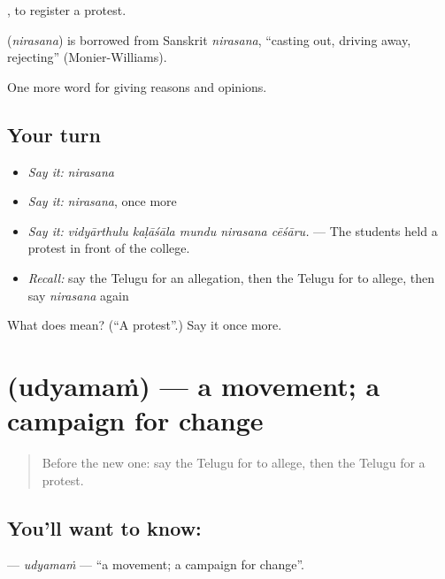  , to register a protest.

\begin{cousinweb}
\textbf{} (\emph{nirasana}) is borrowed from Sanskrit \emph{nirasana}, \textquotedblleft{}casting out, driving away, rejecting\textquotedblright{} (Monier-Williams).
\end{cousinweb}

\begin{grammarlens}[title={What you've built}]
One more word for giving reasons and opinions.
\end{grammarlens}

\subsection*{Your turn}
\begin{itemize}
\raggedright
  \item \emph{Say it:} \emph{nirasana}
  \item \emph{Say it:} \emph{nirasana}, once more
  \item \emph{Say it:} \emph{vidyārthulu kaḷāśāla mundu nirasana cēśāru.} — The students held a protest in front of the college.
  \item \emph{Recall:} say the Telugu for an allegation, then the Telugu for to allege, then say \emph{nirasana} again
\end{itemize}

\begin{tcolorbox}[breakable,colback=teal!4,colframe=teal!35!black,title={Before you move on}]
What does  mean? (\textquotedblleft{}A protest\textquotedblright{}.) Say it once more.
\end{tcolorbox}
\section[\texorpdfstring{\te{ఉద్యమం} (udyamaṁ)}{ఉద్యమం (udyamaṁ)}]{ (udyamaṁ) — a movement; a campaign for change}

\label{lesson:TE-C407-udyamam}



\begin{quote}
Before the new one: say the Telugu for to allege, then the Telugu for a protest.
\end{quote}

\subsection*{You'll want to know: }
\textbf{} — \emph{udyamaṁ} — \textquotedblleft{}a movement; a campaign for change\textquotedblright{}.

